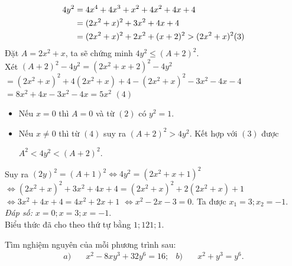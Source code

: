 \begin{bt}
{\begin{enumerate}[a)]
\begin{align*}
4y^2&=4x^4+4x^3+x^2+4x^2+4x+4\\
    &=(2x^2+x)^2+3x^2+4x+4\\
    &=(2x^2+x)^2+2x^2+(x+2)^2>(2x^2+x)^2 \hfill(3)
\end{align*}
Đặt $A=2x^2+x$, ta sẽ chứng minh $4y^2\leq (A+2)^2.$\\
Xét $(A+2)^2-4y^2=(2x^2+x+2)^2-4y^2$\\
$=(2x^2+x)^2+4(2x^2+x)+4-(2x^2+x)^2-3x^2-4x-4$\\
$=8x^2+4x-3x^2-4x=5x^2$ \hfill$(4)$
\begin{itemize}
  \item Nếu $x=0$ thì $A=0$ và từ $(2)$ có $y^2=1$.
  \item Nếu $x\neq 0$ thì từ $(4)$ suy ra $(A+2)^2>4y^2$. Kết hợp với $(3)$ được
  \begin{center}
    $A^2<4y^2<(A+2)^2.$
  \end{center}
\end{itemize}
Suy ra $(2y)^2=(A+1)^2 \Leftrightarrow 4y^2=(2x^2+x+1)^2$\\
$\Leftrightarrow (2x^2+x)^2+3x^2+4x+4=(2x^2+x)^2+2(2x^2+x)+1$\\
$\Leftrightarrow 3x^2+4x+4=4x^2+2x+1$
$\Leftrightarrow x^2-2x-3=0.$ Ta được $x_1=3;x_2=-1$.\\
\emph{Đáp số:} $x=0;x=3;x=-1.$\\
Biểu thức đã cho theo thứ tự bằng $1;121;1.$
\end{enumerate}
}
\end{bt}
\begin{bt} Tìm nghiệm nguyên của mỗi phương trình sau:
\begin{align*}
a)&\quad x^{2}-8xy^{3}+32y^{6}=16;
&b)&\quad x^{2}+y^{3}=y^{6}.
\end{align*}
\end{bt}

